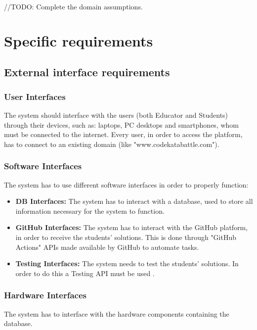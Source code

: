 \documentclass{article}
\begin{document}
{\begin{itemize}
        \end{itemize}


        //TODO: Complete the domain assumptions.

\newpage

\pagestyle{SpecificRequirementsStyle}

\section{Specific requirements}
\subsection{External interface requirements}
    \subsubsection{User Interfaces}
        The system should interface with the users (both Educator and Students) through their 
        devices, such as: laptops, PC desktops and smartphones, whom must be connected to the internet.
        Every user, in order to access the platform, has to connect to an existing domain (like "www.codekatabattle.com").
        
    \subsubsection{Software Interfaces}
        The system has to use different software interfaces in order to properly function:
        \begin{itemize}
            \item \textbf{DB Interfaces:} The system has to interact with a database,
            used to store all information necessary for the system to function.
            \item \textbf{GitHub Interfaces:} The system has to interact with the GitHub platform,
            in order to receive the students' solutions. This is done through "GitHub Actions"
            APIs made available by GitHub to automate tasks.
            \item \textbf{Testing Interfaces:} The system needs to test the students' solutions. 
            In order to do this a Testing API must be used . 
        \end{itemize}

    \subsubsection{Hardware Interfaces}
        The system has to interface with the hardware components containing
        the database.
}
\end{document}
